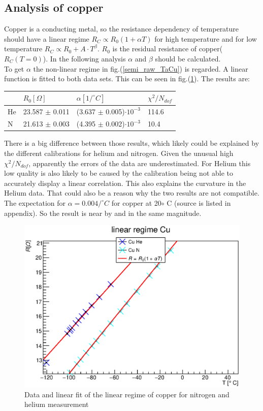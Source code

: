 \documentclass{article}
\begin{document}
\subsection{Analysis of copper}
Copper is a conducting metal, so the resistance dependency of temperature should have a linear regime $R_C \propto R_{0}(1+\alpha T)$ for high temperature and for low temperature $R_C \propto R_{0}+ A \cdot T^\beta$. 
$R_{0}$ is the residual resistance of copper($R_C(T=0)$).
In the following analysis $\alpha$ and $\beta$ should be calculated.\\
To get $\alpha$ the non-linear regime in fig.(\ref{semi_raw_TaCu}) is regarded. A linear function is fitted to both data sets. This can be seen in fig.(\ref{Cu_lin}). The results are:
\begin{table}[H]
    \centering
        \begin{tabular}{l|l|l|l}
         & $R_0 [\Omega]$ & $\alpha [1 / ^\circ C]$ & $\chi^2/N_{dof}$\\\hline
        He & 23.587 $\pm$  0.011  & (3.637 $\pm$ 0.005)$\cdot 10^{-3}$ & 114.6 \\\hline
        N &  21.613 $\pm$ 0.003 &  (4.395 $\pm$ 0.002)$\cdot 10^{-3}$ & 10.4
        \end{tabular}
\end{table}
There is a big difference between those results, which likely could be explained by the different calibrations for helium and nitrogen.
Given the unusual high $\chi^2/N_{dof}$, apparently the errors of the data are underestimated.
For Helium this low quality is also likely to be caused by the calibration being not able to accurately display a linear correlation.
This also explains the curvature in the Helium data.
That could also be a reason why the two results are not compatible.
The expectation for $\alpha = 0.004/ ^\circ C $ for copper at 20$\circ$ C (source is listed in appendix).
So the result is near by and in the same magnitude. \\
\begin{figure}[H]
    \centering
    \includegraphics[width=\textwidth]{Graphen/Cu_lin.eps}
    \caption{Data and linear fit of the linear regime of copper for nitrogen and helium measurement}
    \label{Cu_lin}
\end{figure}
\end{document}
